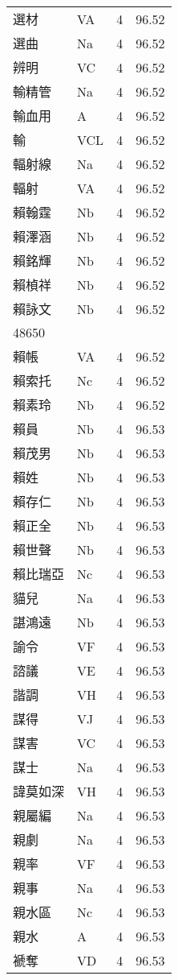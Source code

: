 \documentclass[twocolumn]{book}
\begin{document}
\begin{supertabular}{llrr}
選材 & VA & 4 &  96.52\\
選曲 & Na & 4 &  96.52\\
辨明 & VC & 4 &  96.52\\
輸精管 & Na & 4 &  96.52\\
輸血用 & A & 4 &  96.52\\
輸 & VCL & 4 &  96.52\\
輻射線 & Na & 4 &  96.52\\
輻射 & VA & 4 &  96.52\\
賴翰霆 & Nb & 4 &  96.52\\
賴澤涵 & Nb & 4 &  96.52\\
賴銘輝 & Nb & 4 &  96.52\\
賴楨祥 & Nb & 4 &  96.52\\
賴詠文 & Nb & 4 &  96.52\\
48650\\
賴帳 & VA & 4 &  96.52\\
賴索托 & Nc & 4 &  96.52\\
賴素玲 & Nb & 4 &  96.52\\
賴員 & Nb & 4 &  96.53\\
賴茂男 & Nb & 4 &  96.53\\
賴姓 & Nb & 4 &  96.53\\
賴存仁 & Nb & 4 &  96.53\\
賴正全 & Nb & 4 &  96.53\\
賴世聲 & Nb & 4 &  96.53\\
賴比瑞亞 & Nc & 4 &  96.53\\
貓兒 & Na & 4 &  96.53\\
諶鴻遠 & Nb & 4 &  96.53\\
諭令 & VF & 4 &  96.53\\
諮議 & VE & 4 &  96.53\\
諧調 & VH & 4 &  96.53\\
謀得 & VJ & 4 &  96.53\\
謀害 & VC & 4 &  96.53\\
謀士 & Na & 4 &  96.53\\
諱莫如深 & VH & 4 &  96.53\\
親屬編 & Na & 4 &  96.53\\
親劇 & Na & 4 &  96.53\\
親率 & VF & 4 &  96.53\\
親事 & Na & 4 &  96.53\\
親水區 & Nc & 4 &  96.53\\
親水 & A & 4 &  96.53\\
褫奪 & VD & 4 &  96.53\\

\end{supertabular}
\end{document}

